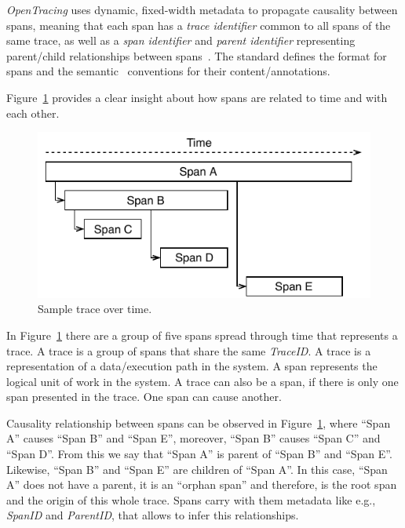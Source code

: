 \emph{OpenTracing} uses dynamic, fixed-width metadata to propagate causality between spans, meaning that each span has a \emph{trace identifier} common to all spans of the same trace, as well as a \emph{span identifier} and \emph{parent identifier} representing parent/child relationships between spans~\cite{Sambasivan2014}. The standard defines the format for spans and the semantic~\cite{open_tracing_semantic_specification, open_tracing_semantic_conventions} conventions for their content/annotations.


Figure~\ref{fig:sample_trace_over_time} provides a clear insight about how spans are related to time and with each other.

\begin{figure}[H]
    \centerline{\includegraphics[width=1.0\linewidth]{images/trace.pdf}}
    \caption{Sample trace over time.}
    \label{fig:sample_trace_over_time}
\end{figure}

In Figure~\ref{fig:sample_trace_over_time} there are a group of five spans spread through time that represents a trace. A trace is a group of spans that share the same \emph{TraceID}.  A trace is a representation of a data/execution path in the system. A span represents the logical unit of work in the system. A trace can also be a span, if there is only one span presented in the trace. One span can cause another.

Causality relationship between spans can be observed in Figure~\ref{fig:sample_trace_over_time}, where ``Span A'' causes ``Span B'' and ``Span E'', moreover, ``Span B'' causes ``Span C'' and ``Span D''. From this we say that ``Span A'' is parent of ``Span B'' and ``Span E''. Likewise, ``Span B'' and ``Span E'' are children of ``Span A''. In this case, ``Span A'' does not have a parent, it is an ``orphan span'' and therefore, is the root span and the origin of this whole trace. Spans carry with them metadata like e.g., \emph{SpanID} and \emph{ParentID}, that allows to infer this relationships.

